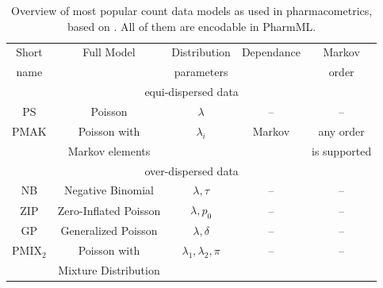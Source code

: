 \begin{table}[htdp]
\centering  %
\begin{tabular}{c c c c c}  
\hline\hline
Short  & Full Model 	& Distribution 	& Dependance 		& Markov \\ [-0.5ex]   
name  & 			& parameters 	& 			 	& order 	\\ [0.5ex]   
\hline
\multicolumn{5}{c}{equi-dispersed data}  \\[.1ex]
\hline
PS  		& Poisson 		& $\lambda$ 	& -- 		& -- 			 \\ [1ex] %
PMAK 	& Poisson with 		& $\lambda_i$ 	& Markov 	& any order 	 \\ [-.5ex] %
		& Markov elements	&			&		& is supported \\[1ex]
\hline
\multicolumn{5}{c}{over-dispersed data}  \\[.1ex]
\hline
NB 		& Negative Binomial 	&  $\lambda, \tau$ 			& -- 	& -- \\ [1ex] %
ZIP 		& Zero-Inflated Poisson 	& $\lambda, p_0$ 			& -- 	& -- \\ [1ex] %
GP 		& Generalized Poisson 	& $\lambda, \delta$ 			& -- 	& -- \\ [1ex] %
PMIX$_2$ & Poisson with 		& $\lambda_1, \lambda_2, \pi$ & -- 	& --  \\ [1ex] %
  		& Mixture Distribution 	&  						&  	&  \\[1ex]
\hline                          %
\end{tabular}
\caption{Overview of most popular count data models as used in pharmacometrics, based on \cite{Plan:2009fk}.
All of them are encodable in PharmML.}
\label{tab:countDataModels}
\end{table}%


